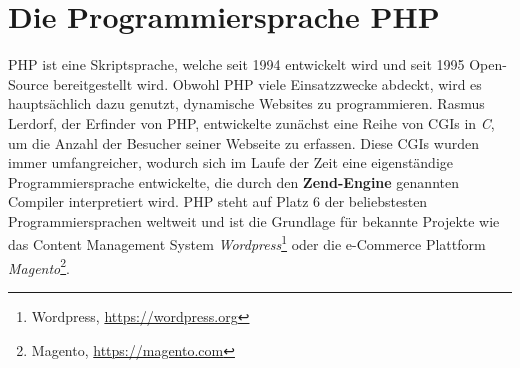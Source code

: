 \section{Die Programmiersprache PHP}
\ac{PHP} ist eine Skriptsprache, welche seit 1994 entwickelt wird und seit 1995 Open-Source bereitgestellt wird.
Obwohl \ac{PHP} viele Einsatzzwecke abdeckt, wird es hauptsächlich dazu genutzt, dynamische Websites zu programmieren. 
Rasmus Lerdorf, der Erfinder von \ac{PHP}, entwickelte zunächst eine Reihe von \acp{CGI} in \textit{C}, um die Anzahl der 
Besucher seiner Webseite zu erfassen. Diese \acp{CGI} wurden immer umfangreicher, wodurch sich im Laufe der Zeit eine 
eigenständige Programmiersprache entwickelte, die durch den \textbf{Zend-Engine} genannten Compiler interpretiert wird.
\ac{PHP} steht auf Platz 6 der beliebstesten Programmiersprachen weltweit\cite{carbonnelle_pypl_2019} und ist die Grundlage
für bekannte Projekte wie das Content Management System \textit{Wordpress}\footnote{Wordpress, \url{https://wordpress.org}}
oder die e-Commerce Plattform \textit{Magento}\footnote{Magento, \url{https://magento.com}}.


